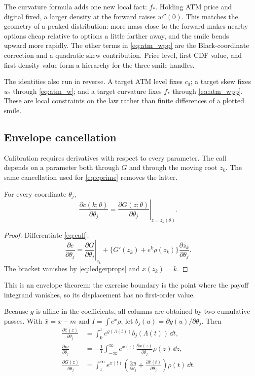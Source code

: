 The curvature formula adds one new local fact: $f_*$.  Holding ATM price and
digital fixed, a larger density at the forward raises $w''(0)$.  This matches
the geometry of a peaked distribution: more mass close to the forward makes
nearby options cheap relative to options a little farther away, and the smile
bends upward more rapidly.  The other terms in \eqref{eq:atm_wpp} are the
Black-coordinate correction and a quadratic skew contribution.  Price level,
first CDF value, and first density value form a hierarchy for the three smile
handles.

The identities also run in reverse.  A target ATM level fixes $c_0$; a target
skew fixes $u_*$ through \eqref{eq:atm_w}; and a target curvature fixes $f_*$
through \eqref{eq:atm_wpp}.  These are local constraints on the law rather
than finite differences of a plotted smile.

\subsection{Envelope cancellation}
\label{sec:jacobian}

Calibration requires derivatives with respect to every parameter.  The call
depends on a parameter both through $G$ and through the moving root $z_k$.
The same cancellation used for \eqref{eq:cprime} removes the latter.

\begin{theorem}
\label{thm:envelope}
For every coordinate $\theta_j$,
\begin{equation}
\frac{\partial c(k;\theta)}{\partial\theta_j}
=\left.\frac{\partial G(z;\theta)}{\partial\theta_j}
\right|_{z=z_k(\theta)}.
\label{eq:envelope}
\end{equation}
\end{theorem}

\begin{proof}
Differentiate \eqref{eq:call}:
\[
\frac{\partial c}{\partial\theta_j}
=\left.\frac{\partial G}{\partial\theta_j}\right|_{z_k}
+\{G'(z_k)+e^k\rho(z_k)\}\frac{\partial z_k}{\partial\theta_j}.
\]
The bracket vanishes by \eqref{eq:ledgerprops} and $x(z_k)=k$.
\end{proof}

This is an envelope theorem: the exercise boundary is the point where the
payoff integrand vanishes, so its displacement has no first-order value.

Because $g$ is affine in the coefficients, all columns are obtained by two
cumulative passes.  With $\bar x=x-m$ and
$I=\int e^{\bar x}\rho$, let $b_j(u)=\partial g(u)/\partial\theta_j$.  Then
\begin{align}
\frac{\partial\bar x(z)}{\partial\theta_j}
&=\int_0^ze^{g(\Lambda(t))}b_j(\Lambda(t))\,\dd t,
\label{eq:pass1}\\
\frac{\partial m}{\partial\theta_j}
&=-\frac1I\int_{-\infty}^\infty
e^{\bar x(z)}\frac{\partial\bar x(z)}{\partial\theta_j}\rho(z)\,\dd z,
\label{eq:pass2}\\
\frac{\partial G(z)}{\partial\theta_j}
&=\int_z^\infty e^{x(t)}
\left(\frac{\partial m}{\partial\theta_j}
+\frac{\partial\bar x(t)}{\partial\theta_j}\right)\rho(t)\,\dd t.
\label{eq:pass3}
\end{align}

